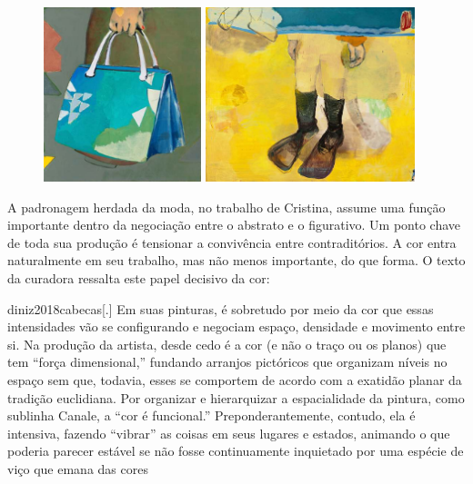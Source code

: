 \begin{figure}
	\begin{minipage}{.45\linewidth}
		\caption{}
		\includegraphics[height=2in]{figuras/canale-geoportatil-2016.pdf.compressed.pdf}
	\end{minipage}\hfill
	\begin{minipage}{.45\linewidth}
		\caption{}
		\includegraphics[height=2in]{figuras/canale-submarino-2012.pdf.compressed.pdf}
	\end{minipage}
\end{figure}

\pagebreak

A padronagem herdada da moda, no trabalho de Cristina, assume uma
função importante dentro da negociação entre o abstrato e o figurativo.
Um ponto chave de toda sua produção é tensionar a convivência entre
contraditórios. A cor entra naturalmente em seu trabalho, mas não menos
importante, do que forma. O texto da curadora \textcite{diniz2018cabecas} ressalta
este papel decisivo da cor:

\begin{displaycquote}{diniz2018cabecas}[.]
	Em suas pinturas, é sobretudo por meio da cor que essas intensidades vão
	se configurando e negociam espaço, densidade e movimento entre si. Na
	produção da artista, desde cedo é a cor (e não o traço ou os planos) que
	tem \enquote{força dimensional,} fundando arranjos pictóricos que organizam
	níveis no espaço sem que, todavia, esses se comportem de acordo com a
	exatidão planar da tradição euclidiana. Por organizar e hierarquizar a
	espacialidade da pintura, como sublinha Canale, a \enquote{cor é funcional.}
	Preponderantemente, contudo, ela é intensiva, fazendo \enquote{vibrar} as
	coisas em seus lugares e estados, animando o que poderia parecer estável
	se não fosse continuamente inquietado por uma espécie de viço que emana
	das cores
\end{displaycquote}

